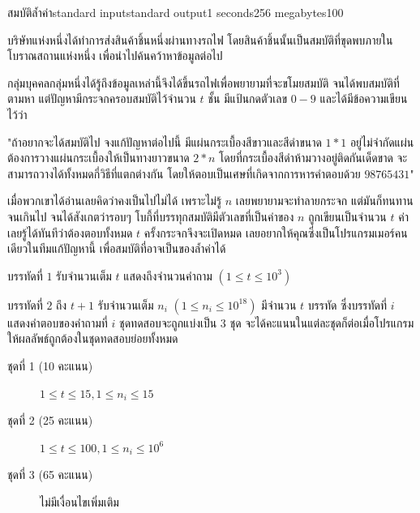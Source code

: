 \documentclass[11pt,a4paper]{article}
\begin{document}
\begin{problem}{สมบัติล้ำค่า}{standard input}{standard output}{1 seconds}{256 megabytes}{100}

บริษัทแห่งหนึ่งได้ทำการส่งสินค้าชิ้นหนึ่งผ่านทางรถไฟ โดยสินค้าชิ้นนั้นเป็นสมบัติที่ขุดพบภายในโบราณสถานแห่งหนึ่ง เพื่อนำไปค้นคว้าหาข้อมูลต่อไป

กลุ่มบุคคลกลุ่มหนึ่งได้รู้ถึงข้อมูลเหล่านี้จึงได้ขึ้นรถไฟเพื่อพยายามที่จะขโมยสมบัติ จนได้พบสมบัติที่ตามหา แต่ปัญหามีกระจกครอบสมบัติไว้จำนวน $t$ ชั้น มีแป้นกดตัวเลข $0-9$ และได้มีข้อความเขียนไว้ว่า 

"ถ้าอยากจะได้สมบัติไป จงแก้ปัญหาต่อไปนี้ มีแผ่นกระเบื้องสีขาวและสีดำขนาด $1*1$ อยู่ไม่จำกัดแผ่น ต้องการวางแผ่นกระเบื้องให้เป็นทางยาวขนาด $2*n$ โดยที่กระเบื้องสีดำห้ามวางอยู่ติดกันเด็ดขาด จะสามารถวางได้ทั้งหมดกี่วิธีที่แตกต่างกัน โดยให้ตอบเป็นเศษที่เกิดจากการหารคำตอบด้วย $98765431$"

เมื่อพวกเขาได้อ่านเลยคิดว่าคงเป็นไปไม่ได้ เพราะไม่รู้ $n$ เลยพยายามจะทำลายกระจก แต่มันก็ทนทานจนเกินไป จนได้สังเกตว่ารอบๆ โบกี้ที่บรรทุกสมบัติมีตัวเลขที่เป็นค่าของ $n$ ถูกเขียนเป็นจำนวน $t$ ค่า เลยรู้ได้ทันทีว่าต้องตอบทั้งหมด $t$ ครั้งกระจกจึงจะเปิดหมด เลยอยากให้คุณซึ่งเป็นโปรแกรมเมอร์คนเดียวในทีมแก้ปัญหานี้ เพื่อสมบัติที่อาจเป็นของล้ำค่าได้

\InputFile
บรรทัดที่ $1$ รับจำนวนเต็ม $t$ แสดงถึงจำนวนคำถาม $(1 \leq t \leq 10^3)$

บรรทัดที่ $2$ ถึง $t + 1$ รับจำนวนเต็ม $n_i$ $(1 \leq n_i \leq10^{18})$
\OutputFile
มีจำนวน $t$ บรรทัด ซึ่งบรรทัดที่ $i$ แสดงคำตอบของคำถามที่ $i$ 
\Scoring
ชุดทดสอบจะถูกแบ่งเป็น $3$ ชุด จะได้คะแนนในแต่ละชุดก็ต่อเมื่อโปรแกรมให้ผลลัพธ์ถูกต้องในชุดทดสอบย่อยทั้งหมด

\begin{description}

\item[ชุดที่ 1 (10 คะแนน)]  $1 \leq t \leq 15 , 1 \leq n_i \leq 15$ 

\item[ชุดที่ 2 (25 คะแนน)] $1 \leq t \leq 100 , 1 \leq n_i \leq 10^{6}$

\item[ชุดที่ 3 (65 คะแนน)] ไม่มีเงื่อนไขเพิ่มเติม

\end{description}

\Examples

\begin{example}
%
%
\end{example}


\end{problem}
\end{document}
